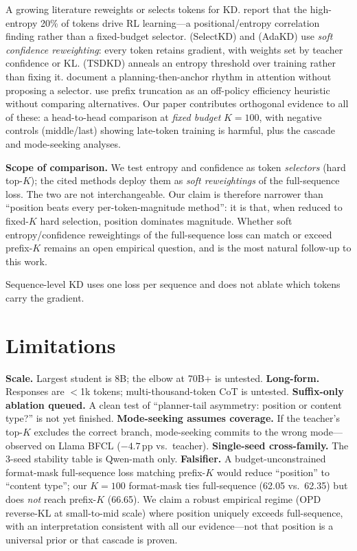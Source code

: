 \documentclass[10pt]{article}
\begin{document}
A growing literature reweights or selects tokens for KD. \citet{wang2025beyond8020} report that the high-entropy 20\% of tokens drive RL learning---a positional/entropy correlation finding rather than a fixed-budget selector. \citet{huang2025selectkd} (SelectKD) and \citet{xie2026adakd} (AdaKD) use \emph{soft confidence reweighting}: every token retains gradient, with weights set by teacher confidence or KL. \citet{kim2026tsdkd} (TSDKD) anneals an entropy threshold over training rather than fixing it. \citet{li2025preplan} document a planning-then-anchor rhythm in attention without proposing a selector. \citet{chen2025distillingessence} use prefix truncation as an off-policy efficiency heuristic without comparing alternatives. Our paper contributes orthogonal evidence to all of these: a head-to-head comparison at \emph{fixed budget} $K{=}100$, with negative controls (middle/last) showing late-token training is harmful, plus the cascade and mode-seeking analyses.

\textbf{Scope of comparison.} We test entropy and confidence as token \emph{selectors} (hard top-$K$); the cited methods deploy them as \emph{soft reweightings} of the full-sequence loss. The two are not interchangeable. Our claim is therefore narrower than ``position beats every per-token-magnitude method'': it is that, when reduced to fixed-$K$ hard selection, position dominates magnitude. Whether soft entropy/confidence reweightings of the full-sequence loss can match or exceed prefix-$K$ remains an open empirical question, and is the most natural follow-up to this work.

Sequence-level KD \citep{kim2016sequence,gu2024minillm} uses one loss per sequence and does not ablate which tokens carry the gradient.


\section{Limitations}
\label{sec:limitations}

\textbf{Scale.} Largest student is 8B; the elbow at 70B+ is untested. \textbf{Long-form.} Responses are $<$1k tokens; multi-thousand-token CoT is untested. \textbf{Suffix-only ablation queued.} A clean test of ``planner-tail asymmetry: position or content type?'' is not yet finished. \textbf{Mode-seeking assumes coverage.} If the teacher's top-$K$ excludes the correct branch, mode-seeking commits to the wrong mode---observed on Llama BFCL ($-4.7$\,pp vs.\ teacher). \textbf{Single-seed cross-family.} The 3-seed stability table is Qwen-math only. \textbf{Falsifier.} A budget-unconstrained format-mask full-sequence loss matching prefix-$K$ would reduce ``position'' to ``content type''; our $K{=}100$ format-mask ties full-sequence (62.05 vs.\ 62.35) but does \emph{not} reach prefix-$K$ (66.65). We claim a robust empirical regime (OPD reverse-KL at small-to-mid scale) where position uniquely exceeds full-sequence, with an interpretation consistent with all our evidence---not that position is a universal prior or that cascade is proven.
\end{document}
